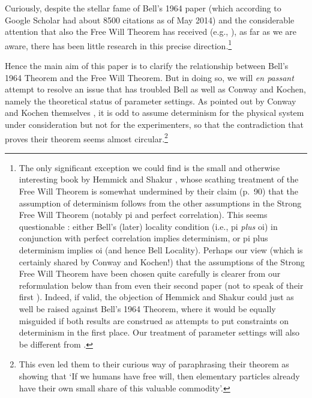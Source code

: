 \documentclass[11pt]{article}
\begin{document}
Curiously, despite the stellar fame of Bell's 1964 paper (which according to Google Scholar had about 8500 citations as of May 2014) and the considerable attention that also the Free Will Theorem has received (e.g., \cite{GT,GtH}), as far as we are aware, there has been little research in this precise direction.\footnote{The only significant exception we could find is the small and otherwise interesting book by Hemmick and Shakur \cite{HS}, whose scathing  treatment of the  Free Will Theorem  is somewhat undermined by their claim (p.\ 90) that the assumption of determinism follows from the other assumptions in the Strong Free Will Theorem (notably {\sc pi} and perfect correlation). This seems questionable \cite{Wiseman}: 
either Bell's (later) locality condition  (i.e., {\sc pi} \emph{plus} {\sc oi})  in conjunction with perfect correlation  implies determinism,
or   {\sc pi} plus  determinism  implies {\sc oi} (and hence Bell Locality). Perhaps our view (which is certainly shared by Conway and Kochen!) that the assumptions of the Strong Free Will Theorem have been chosen quite carefully is clearer from our reformulation below than from even their second paper \cite{CK2} (not to speak of  their first \cite{CK1}). Indeed, if valid, the objection of  Hemmick and Shakur could just as well be raised against Bell's 1964 Theorem, where it would be equally misguided if both results are construed as attempts to put constraints on determinism in the first place. Our treatment of parameter settings will also be different from \cite{HS}.} 

Hence the main aim of this paper is to clarify the relationship between Bell's 1964 Theorem and the Free Will Theorem. But in doing so, we will \emph{en passant} attempt to resolve an issue that has troubled Bell as well as Conway and Kochen, namely the theoretical status of parameter settings.
As pointed out by Conway and Kochen themselves \cite{CK2}, it is odd to assume determinism for the physical system under consideration but not for the experimenters, so that the contradiction that proves their theorem seems almost circular.\footnote{This even led them to their curious way of paraphrasing their theorem as showing that 
`If we humans have free will, then elementary particles already
have their own small share of this valuable commodity'.}
\end{document}

